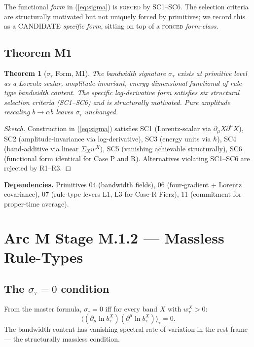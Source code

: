 \documentclass[11pt,a4paper]{article}
\newtheorem{theorem}{Theorem}[section]
\begin{document}
The functional \emph{form} in (\ref{eq:sigma}) is \textsc{forced} by SC1--SC6. The selection criteria are structurally motivated but not uniquely forced by primitives; we record this as a CANDIDATE \emph{specific form}, sitting on top of a \textsc{forced} \emph{form-class}.

\subsection{Theorem M1}

\begin{theorem}[$\sigma_\tau$ Form, M1]
The bandwidth signature $\sigma_\tau$ exists at primitive level as a Lorentz-scalar, amplitude-invariant, energy-dimensional functional of rule-type bandwidth content. The specific log-derivative form satisfies six structural selection criteria (SC1--SC6) and is structurally motivated. Pure amplitude rescaling $b \to \alpha b$ leaves $\sigma_\tau$ unchanged.
\end{theorem}

\begin{proof}[Sketch]
Construction in (\ref{eq:sigma}) satisfies SC1 (Lorentz-scalar via $\partial_\mu X \partial^\mu X$), SC2 (amplitude-invariance via log-derivative), SC3 (energy units via $\hbar$), SC4 (band-additive via linear $\Sigma_X w^X$), SC5 (vanishing achievable structurally), SC6 (functional form identical for Case P and R). Alternatives violating SC1--SC6 are rejected by R1--R3.
\end{proof}

\textbf{Dependencies.} Primitives 04 (bandwidth fields), 06 (four-gradient + Lorentz covariance), 07 (rule-type levers L1, L3 for Case-R Fierz), 11 (commitment for proper-time average).

\section{Arc M Stage M.1.2 --- Massless Rule-Types}

\subsection{The $\sigma_\tau = 0$ condition}

From the master formula, $\sigma_\tau = 0$ iff for every band $X$ with $w_\tau^X > 0$:
\begin{equation}
\langle (\partial_\mu \ln b_\tau^X)(\partial^\mu \ln b_\tau^X) \rangle_\tau = 0.
\end{equation}
The bandwidth content has vanishing spectral rate of variation in the rest frame --- the structurally massless condition.
\end{document}
